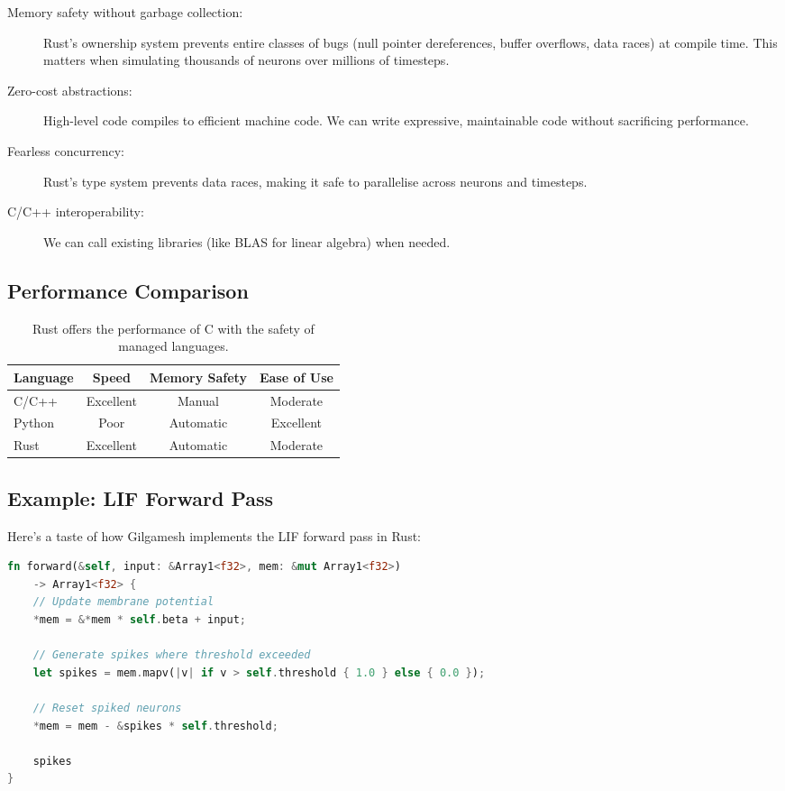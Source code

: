 \documentclass[11pt,a4paper]{article}
\begin{document}
\begin{description}
    \item[Memory safety without garbage collection:] Rust's ownership system prevents entire classes of bugs (null pointer dereferences, buffer overflows, data races) at compile time. This matters when simulating thousands of neurons over millions of timesteps.

    \item[Zero-cost abstractions:] High-level code compiles to efficient machine code. We can write expressive, maintainable code without sacrificing performance.

    \item[Fearless concurrency:] Rust's type system prevents data races, making it safe to parallelise across neurons and timesteps.

    \item[C/C++ interoperability:] We can call existing libraries (like BLAS for linear algebra) when needed.
\end{description}

\subsection{Performance Comparison}

\begin{table}[H]
\centering
\begin{tabular}{lccc}
\toprule
\textbf{Language} & \textbf{Speed} & \textbf{Memory Safety} & \textbf{Ease of Use} \\
\midrule
C/C++ & Excellent & Manual & Moderate \\
Python & Poor & Automatic & Excellent \\
Rust & Excellent & Automatic & Moderate \\
\bottomrule
\end{tabular}
\caption{Rust offers the performance of C with the safety of managed languages.}
\end{table}

\subsection{Example: LIF Forward Pass}

Here's a taste of how Gilgamesh implements the LIF forward pass in Rust:

\begin{lstlisting}[language=Rust, caption={Simplified LIF forward pass in Rust}]
fn forward(&self, input: &Array1<f32>, mem: &mut Array1<f32>)
    -> Array1<f32> {
    // Update membrane potential
    *mem = &*mem * self.beta + input;

    // Generate spikes where threshold exceeded
    let spikes = mem.mapv(|v| if v > self.threshold { 1.0 } else { 0.0 });

    // Reset spiked neurons
    *mem = mem - &spikes * self.threshold;

    spikes
}
\end{lstlisting}
\end{document}
